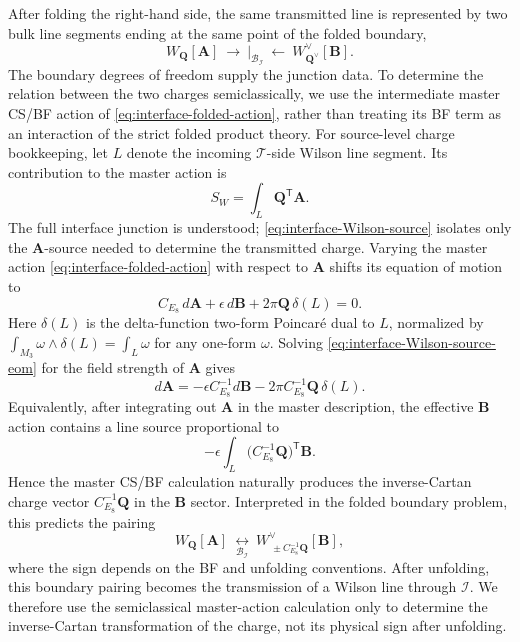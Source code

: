 \documentclass[11pt,a4paper]{article}
\numberwithin{equation}{section}
\begin{document}
After folding the right-hand side, the same transmitted line is represented by two bulk line segments ending at the same point of the folded boundary,
\[
  W_{\boldsymbol Q}[\boldsymbol A]
  \ \longrightarrow\ 
  \Big|_{\mathcal B_{\mathcal I}}
  \ \longleftarrow\ 
  W_{\boldsymbol Q^\vee}^{\vee}[\boldsymbol B].
\]
The boundary degrees of freedom supply the junction data.  To determine the relation between the two charges semiclassically, we use the intermediate master CS/BF action of \eqref{eq:interface-folded-action}, rather than treating its BF term as an interaction of the strict folded product theory.  For source-level charge bookkeeping, let $L$ denote the incoming $\mathcal T$-side Wilson line segment.  Its contribution to the master action is
\begin{equation}
  S_W=\int_L \boldsymbol Q^{\mathsf T}\boldsymbol A .
  \label{eq:interface-Wilson-source}
\end{equation}
The full interface junction is understood; \eqref{eq:interface-Wilson-source} isolates only the $\boldsymbol A$-source needed to determine the transmitted charge.  Varying the master action \eqref{eq:interface-folded-action} with respect to $\boldsymbol A$ shifts its equation of motion to
\begin{equation}
  C_{E_8}\,d\boldsymbol A
  +\epsilon\,d\boldsymbol B
  +2\pi\boldsymbol Q\,\delta(L)=0.
  \label{eq:interface-Wilson-source-eom}
\end{equation}
Here $\delta(L)$ is the delta-function two-form Poincar\'e dual to $L$, normalized by $\int_{M_3}\omega\wedge\delta(L)=\int_L\omega$ for any one-form $\omega$.  Solving \eqref{eq:interface-Wilson-source-eom} for the field strength of $\boldsymbol A$ gives
\[
  d\boldsymbol A
  =-\epsilon C_{E_8}^{-1}d\boldsymbol B
  -2\pi C_{E_8}^{-1}\boldsymbol Q\,\delta(L).
\]
Equivalently, after integrating out $\boldsymbol A$ in the master description, the effective $\boldsymbol B$ action contains a line source proportional to
\[
  -\epsilon\int_L
  \bigl(C_{E_8}^{-1}\boldsymbol Q\bigr)^{\mathsf T}\boldsymbol B .
\]
Hence the master CS/BF calculation naturally produces the inverse-Cartan charge vector $C_{E_8}^{-1}\boldsymbol Q$ in the $\boldsymbol B$ sector.  Interpreted in the folded boundary problem, this predicts the pairing
\[
  W_{\boldsymbol Q}[\boldsymbol A]
  \ \underset{\mathcal B_{\mathcal I}}{\longleftrightarrow}\ 
  W^\vee_{\,\pm C_{E_8}^{-1}\boldsymbol Q}[\boldsymbol B],
\]
where the sign depends on the BF and unfolding conventions.  After unfolding, this boundary pairing becomes the transmission of a Wilson line through $\mathcal I$.  We therefore use the semiclassical master-action calculation only to determine the inverse-Cartan transformation of the charge, not its physical sign after unfolding.
\end{document}
